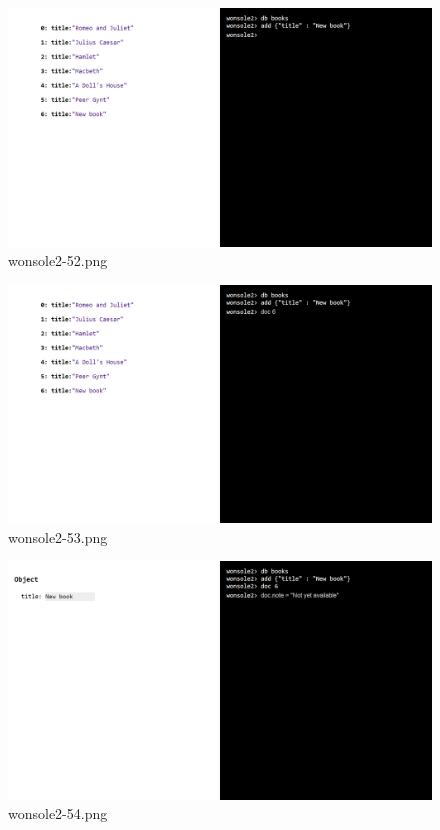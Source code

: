 \begin{figure}
\includegraphics[width=\textwidth]{screenshot/wonsole2/wonsole2-52.png}
\caption{wonsole2-52.png}
\label{wonsole2-52.png}
\end{figure}


\clearpage
\begin{figure}
\includegraphics[width=\textwidth]{screenshot/wonsole2/wonsole2-53.png}
\caption{wonsole2-53.png}
\label{wonsole2-53.png}
\end{figure}


\begin{figure}
\includegraphics[width=\textwidth]{screenshot/wonsole2/wonsole2-54.png}
\caption{wonsole2-54.png}
\label{wonsole2-54.png}
\end{figure}


